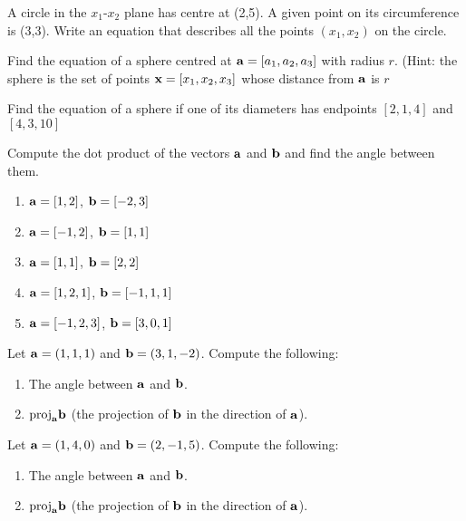 \begin{problem}
\label{2008_a1_3}
A circle in the $x_1$-$x_2$ plane has centre at (2,5). A given
point on its circumference is (3,3). Write an equation that describes
all the points $(x_1,x_2)$ on the circle. 
\end{problem}

\begin{problem}
\label{op1_5}
Find the equation of a sphere centred at $\aa=[a_1,a_2,a_3]$ with
radius $r$.  (Hint: the sphere is the set of points
$\xx=[x_1,x_2,x_3]$ whose distance from $\aa$ is $r$
\end{problem}

\begin{problem}
\label{op1_6}
Find the equation of a sphere if one of its diameters has endpoints
$[2,1,4]$ and $[4,3,10]$
\end{problem}

\begin{problem}
\label{op1_7}
Compute the dot product of the vectors $\aa$ and $\bb$ and find the angle
between them.
{\begin{enumerate}
\renewcommand{\labelenumi}{(\roman{enumi})}
\item $\aa=[1,2]$, $\bb=[-2,3]$
\item $\aa=[-1,2]$, $\bb=[1,1]$
\item $\aa=[1,1]$, $\bb=[2,2]$
\item $\aa=[1,2,1]$, $\bb=[-1,1,1]$
\item $\aa=[-1,2,3]$, $\bb=[3,0,1]$
\end{enumerate}}
\end{problem}

\begin{problem}
\label{2009_a1_4}
Let ${\bf a} = (1,1,1)$ and ${\bf b} = (3,1,-2)$. Compute the
following:
\begin{enumerate}
\item The angle between ${\bf a}$ and ${\bf b}$.
\item $ \mbox{proj}_{\bf a} {\bf b}$ (the projection of $\bf b$ in the
direction of $\bf a$).
\end{enumerate}
\end{problem}

\begin{problem}
\label{2008_a1_5}
Let ${\bf a} = (1,4,0)$ and ${\bf b} = (2,-1,5)$. Compute the
following:
{\begin{enumerate}
\renewcommand{\labelenumi}{(\alph{enumi})}
\item The angle between ${\bf a}$ and ${\bf b}$.
\item $ \mbox{proj}_{\bf a} {\bf b}$ (the projection of $\bf b$ in the
direction of $\bf a$). 
\end{enumerate}}
\end{problem}

